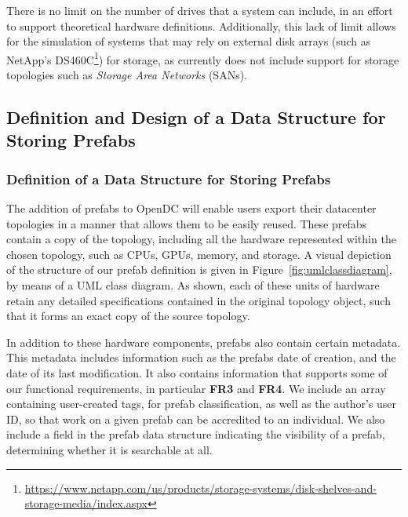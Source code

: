 \documentclass[11pt]{article}
\begin{document}
			There is no limit on the number of drives that a system can include, in an effort to support theoretical hardware definitions.
			Additionally, this lack of limit allows for the simulation of systems that may rely on external disk arrays (such as NetApp's DS460C\footnote{\url{https://www.netapp.com/us/products/storage-systems/disk-shelves-and-storage-media/index.aspx}}) for storage, as \opendc{} currently does not include support for storage topologies such as \textit{Storage Area Networks} (SANs).
	
	\subsection{Definition and Design of a Data Structure for Storing Prefabs}

		\subsubsection{Definition of a Data Structure for Storing Prefabs} \label{sec:datastructuredefinition}
			The addition of prefabs to OpenDC will enable users export their datacenter topologies in a manner that allows them to be easily reused.
			These prefabs contain a copy of the topology, including all the hardware represented within the chosen topology, such as CPUs, GPUs, memory, and storage.
			A visual depiction of the structure of our prefab definition is given in Figure~\ref{fig:umlclassdiagram}, by means of a UML class diagram.
			As shown, each of these units of hardware retain any detailed specifications contained in the original topology object, such that it forms an exact copy of the source topology.

			In addition to these hardware components, prefabs also contain certain metadata.
			This metadata includes information such as the prefabs date of creation, and the date of its last modification.
			It also contains information that supports some of our functional requirements, in particular \textbf{FR3} and \textbf{FR4}.
			We include an array containing user-created tags, for prefab classification, as well as the author's user ID, so that work on a given prefab can be accredited to an individual.
			We also include a field in the prefab data structure indicating the visibility of a prefab, determining whether it is searchable at all.
\end{document}
